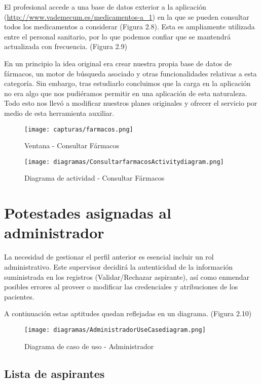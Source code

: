 \documentclass[11pt,spanish,
		listoftables,listoffigures]
		{tfgplantilla}
\begin{document}
El profesional accede a una base de datos exterior a la aplicación (\url {http://www.vademecum.es/medicamentos-a_1}) en la que se pueden consultar todos los medicamentos a considerar (Figura 2.8). Esta es ampliamente utilizada entre el personal sanitario, por lo que podemos confiar que se mantendrá actualizada con frecuencia. (Figura 2.9)

En un principio la idea original era crear nuestra propia base de datos de fármacos, un motor de búsqueda asociado y otras funcionalidades relativas a esta categoría. Sin embargo, tras estudiarlo concluimos que la carga en la aplicación no era algo que nos pudiéramos permitir en una aplicación de esta naturaleza. Todo esto nos llevó a modificar nuestros planes originales y ofrecer el servicio por medio de esta herramienta auxiliar.

\begin{figure}[H]
\centering
\texttt{[image: capturas/farmacos.png]}
\caption{Ventana - Consultar Fármacos}
\end{figure}

\begin{figure}[H]
\centering
\texttt{[image: diagramas/ConsultarfarmacosActivitydiagram.png]}
\caption{Diagrama de actividad -  Consultar Fármacos}
\end{figure}

\vfill
\section {Potestades asignadas al administrador}
La necesidad de gestionar el perfil anterior es esencial incluir un rol administrativo. Este supervisor decidirá la autenticidad de la información suministrada en los registros (Validar/Rechazar aspirante), así como enmendar posibles errores al proveer o modificar las credenciales y atribuciones de los pacientes.

A continuación estas aptitudes quedan reflejadas en un diagrama. (Figura 2.10)

\begin{landscape}
	\begin{figure}[H]
	\centering
	\texttt{[image: diagramas/AdministradorUseCasediagram.png]}
	\caption{Diagrama de caso de uso - Administrador}
	\end{figure}
\end{landscape}

\vfill
\subsection {Lista de aspirantes}
\end{document}
